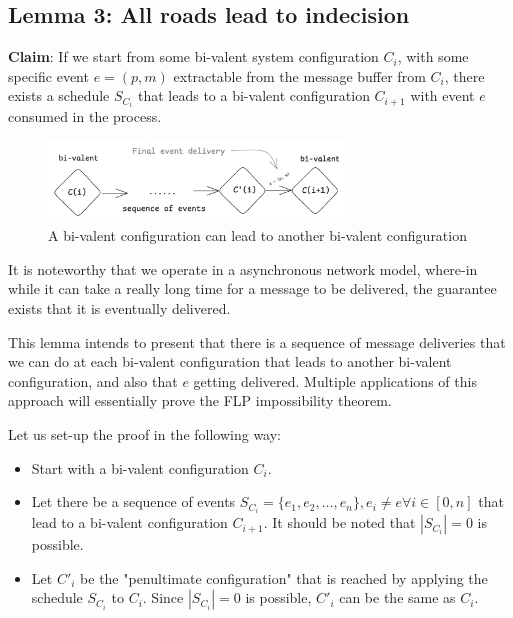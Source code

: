 \subsection{Lemma 3: All roads lead to indecision}
\textbf{Claim}: If we start from some bi-valent system configuration $C_i$, with some specific event $e = (p, m)$ extractable from the message buffer from $C_i$, there exists a schedule $S_{C_i}$ that leads to a bi-valent configuration $C_{i+1}$ with event $e$ consumed in the process.

\begin{figure}[H]
    \centering
    \includegraphics[width=0.7\textwidth]{time-synchrony-failures/flp-impossibility/assets/flp-sequence-bivalent-to-bivalent.png}
    \caption{A bi-valent configuration can lead to another bi-valent configuration}
    \label{fig:bivalent-to-bivalent}
\end{figure}

It is noteworthy that we operate in a asynchronous network model, where-in while it can take a really long time for a message to be delivered, the guarantee exists that it is eventually delivered.

This lemma intends to present that there is a sequence of message deliveries that we can do at each bi-valent configuration that leads to another bi-valent configuration, and also that $e$ getting delivered. Multiple applications of this approach will essentially prove the FLP impossibility theorem.

Let us set-up the proof in the following way:
\begin{itemize}
    \item Start with a bi-valent configuration $C_i$.
    \item Let there be a sequence of events $S_{C_i} = \{e_1, e_2, \ldots, e_n\}, e_i \ne e \forall i \in [0, n]$ that lead to a bi-valent configuration $C_{i+1}$. It should be noted that $|S_{C_i}| = 0$ is possible.
    \item Let $C'_{i}$ be the "penultimate configuration" that is reached by applying the schedule $S_{C_i}$ to $C_i$. Since $|S_{C_i}| = 0$ is possible, $C'_{i}$ can be the same as $C_i$.
\end{itemize}

